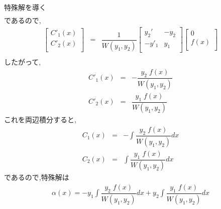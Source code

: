 \documentclass[a4paper]{jsarticle}
\begin{document}
\begin{itembox}[l]{特殊解を導く}
\begin{eqnarray*}
    \end{eqnarray*}
    であるので,
    \begin{eqnarray*}
        \begin{bmatrix}
            C'_1\left(x\right) \\
            C'_2\left(x\right) \\
        \end{bmatrix}
        &=&
        \dfrac{1}{W\left(y_1,y_2\right)}
        \begin{bmatrix}
            y_2'  & -y_2 \\
            -y'_1 & y_1  \\
        \end{bmatrix}
        \begin{bmatrix}
            0               \\
            f\left(x\right) \\
        \end{bmatrix}\\
    \end{eqnarray*}
    したがって,
    \begin{eqnarray*}
        C'_1\left(x\right)&=&-\dfrac{y_2\;f\left(x\right)}{W\left(y_1,y_2\right)}\\
        C'_2\left(x\right)&=&\dfrac{y_1\;f\left(x\right)}{W\left(y_1,y_2\right)}
    \end{eqnarray*}
    これを両辺積分すると,
    \begin{eqnarray*}
        \displaystyle
        C_1\left(x\right)&=&-\int\dfrac{y_2\;f\left(x\right)}{W\left(y_1,y_2\right)}dx\\
        C_2\left(x\right)&=&\int\dfrac{y_1\;f\left(x\right)}{W\left(y_1,y_2\right)}dx
    \end{eqnarray*}
    であるので,特殊解は
    \begin{eqnarray*}
        \alpha\left(x\right)=-y_1\int\dfrac{y_2\;f\left(x\right)}{W\left(y_1,y_2\right)}dx+y_2\int\dfrac{y_1\;f\left(x\right)}{W\left(y_1,y_2\right)}dx
    \end{eqnarray*}
\end{itembox}
\end{document}

